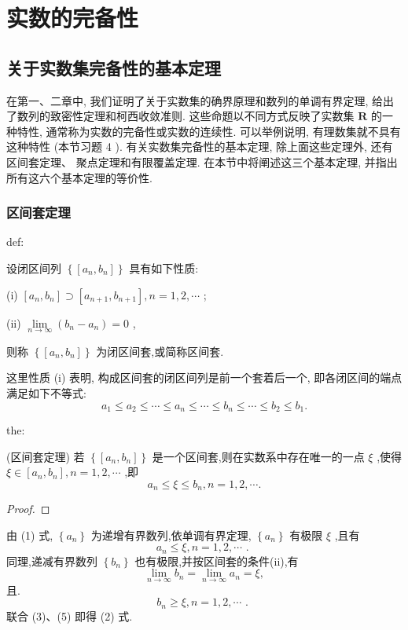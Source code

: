\chapter{实数的完备性}

\section{关于实数集完备性的基本定理}

在第一、二章中, 我们证明了关于实数集的确界原理和数列的单调有界定理, 给出了数列的致密性定理和柯西收敛准则. 这些命题以不同方式反映了实数集 \(\mathbf{R}\) 的一种特性, 通常称为实数的完备性或实数的连续性. 可以举例说明, 有理数集就不具有这种特性 (本节习题 4 ). 有关实数集完备性的基本定理, 除上面这些定理外, 还有区间套定理、 聚点定理和有限覆盖定理. 在本节中将阐述这三个基本定理, 并指出所有这六个基本定理的等价性.

\subsection{区间套定理}

\begin{definition}{}{def:}

\end{definition}
设闭区间列 \(\left\{  \left\lbrack  {{a}_{n},{b}_{n}}\right\rbrack  \right\}\) 具有如下性质:

(i) \(\left\lbrack  {{a}_{n},{b}_{n}}\right\rbrack   \supset  \left\lbrack  {{a}_{n + 1},{b}_{n + 1}}\right\rbrack  ,n = 1,2,\cdots\) ;

(ii) \(\mathop{\lim }\limits_{{n \rightarrow  \infty }}\left( {{b}_{n} - {a}_{n}}\right)  = 0\) ,

则称 \(\left\{  \left\lbrack  {{a}_{n},{b}_{n}}\right\rbrack  \right\}\) 为闭区间套,或简称区间套.

这里性质 (i) 表明, 构成区间套的闭区间列是前一个套着后一个, 即各闭区间的端点满足如下不等式:
\[
{a}_{1} \leq  {a}_{2} \leq  \cdots  \leq  {a}_{n} \leq  \cdots  \leq  {b}_{n} \leq  \cdots  \leq  {b}_{2} \leq  {b}_{1}. \tag{1}
\]
\begin{theorem}{}{the:}

\end{theorem}
 (区间套定理) 若 \(\left\{  \left\lbrack  {{a}_{n},{b}_{n}}\right\rbrack  \right\}\) 是一个区间套,则在实数系中存在唯一的一点 \(\xi\) ,使得 \(\xi  \in  \left\lbrack  {{a}_{n},{b}_{n}}\right\rbrack  ,n = 1,2,\cdots\) ,即
\[
{a}_{n} \leq  \xi  \leq  {b}_{n},n = 1,2,\cdots . \tag{2}
\]
\begin{proof}

\end{proof}
由 (1) 式, \(\left\{  {a}_{n}\right\}\) 为递增有界数列,依单调有界定理, \(\left\{  {a}_{n}\right\}\) 有极限 \(\xi\) ,且有
\[
{a}_{n} \leq  \xi ,n = 1,2,\cdots \text{ . } \tag{3}
\]
同理,递减有界数列 \(\left\{  {b}_{n}\right\}\) 也有极限,并按区间套的条件(ii),有
\[
\mathop{\lim }\limits_{{n \rightarrow  \infty }}{b}_{n} = \mathop{\lim }\limits_{{n \rightarrow  \infty }}{a}_{n} = \xi , \tag{4}
\]
且.
\[
{b}_{n} \geq  \xi ,n = 1,2,\cdots \text{ . } \tag{5}
\]
联合 (3)、(5) 即得 (2) 式.

